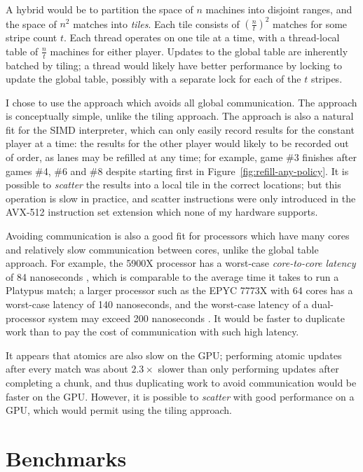 A hybrid would be to partition the space of $n$ machines into disjoint
ranges, and the space of $n^2$ matches into \emph{tiles}.
Each tile consists of $(\frac{n}{t})^2$ matches for some stripe count $t$. Each
thread operates on one tile at a time, with a thread-local table of $\frac{n}{t}$
machines for either player. Updates to the global table are inherently batched
by tiling; a thread would likely have better performance by locking to update
the global table, possibly with a separate lock for each of the $t$ stripes.

I chose to use the approach which avoids all global communication.
The approach is conceptually simple, unlike the tiling approach. The approach
is also a natural fit for the SIMD interpreter, which can only easily
record results for the constant player at a time: the results for the
other player would likely to be recorded out of order, as lanes may
be refilled at any time; for example, game \#3 finishes after games \#4, \#6
and \#8 despite starting first in Figure~\ref{fig:refill-any-policy}. It is possible to
\emph{scatter} the results into a local tile in the correct locations; but this
operation is slow in practice, and scatter instructions were only introduced
in the AVX-512 instruction set extension which none of my hardware supports.

Avoiding communication is also a good fit for processors which have
many cores and relatively slow communication between cores, unlike
the global table approach. For example, the 5900X processor has a worst-case
\emph{core-to-core latency} of 84 nanoseconds
\cite{core-to-core}, which is comparable to the average time it takes to
run a Platypus match; a larger processor such as the EPYC 7773X with
64 cores has a worst-case latency of 140 nanoseconds, and the worst-case
latency of a dual-processor system may exceed 200 nanoseconds
\cite{core-to-core-2}. It would be faster to duplicate work than to pay the cost
of communication with such high latency.

It appears that atomics are also slow on the GPU; performing atomic updates
after every match was about $2.3\times$ slower than only performing updates
after completing a chunk, and thus duplicating work to avoid communication
would be faster on the GPU. However, it is possible to \emph{scatter} with good
performance on a GPU, which would permit using the tiling approach. 

\section{Benchmarks}

